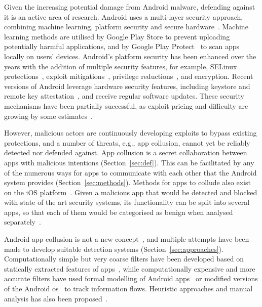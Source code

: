\documentclass[article, oneside]{aaltoseries}
\newcommand{\Sref}[1]{Section~\ref{#1}}
\begin{document}
Given the increasing potential damage from Android malware, defending against it is an active area of research. Android uses a multi-layer security approach, combining machine learning, platform security and secure hardware~\cite{AOSP2018}. Machine learning methods are utilised by Google Play Store to prevent uploading potentially harmful applications, and by Google Play Protect~\cite{AOSPplayprotect} to scan apps locally on users' devices. Android's platform security has been enhanced over the years with the addition of multiple security features, for example, SELinux protections~\cite[\href{https://source.android.com/security/selinux}{``Security-Enhanced Linux in Android''}]{AOSPsecurity}, exploit mitigations~\cite{Edge2016}, privilege reductions~\cite{Lawrence2017}, and encryption. Recent versions of Android leverage hardware security features, including keystore and remote key attestation~\cite{Willden2017}, and receive regular software updates. These security mechanisms have been partially successful, as exploit pricing and difficulty are growing by some estimates~\cite{AOSP2018}.

However, malicious actors are continuously developing exploits to bypass existing protections, and a number of threats, e.g., app collusion, cannot yet be reliably detected nor defended against. App collusion is a secret collaboration between apps with malicious intentions (\Sref{sec:def}). This can be facilitated by any of the numerous ways for apps to communicate with each other that the Android system provides (\Sref{sec:methods}). Methods for apps to collude also exist on the iOS platform~\cite{Deshotels2016}. Given a malicious app that would be detected and blocked with state of the art security systems, its functionality can be split into several apps, so that each of them would be categorised as benign when analysed separately~\cite{Chen2018}.

Android app collusion is not a new concept~\cite{Schlegel2011}, and multiple attempts have been made to develop suitable detection systems (\Sref{sec:approaches}). Computationally simple but very coarse filters have been developed based on statically extracted features of apps~\cite{Asavoae2016, Chen2018}, while computationally expensive and more accurate filters have used formal modelling of Android apps~\cite{Asavoae2018} or modified versions of the Android \gls{os}~\cite{Enck2014} to track information flows. Heuristic approaches and manual analysis has also been proposed~\cite{Muttik2016}.
\end{document}
